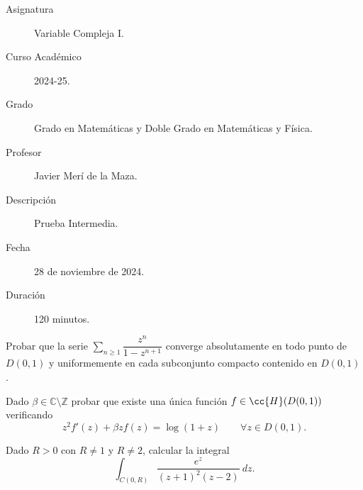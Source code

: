 \documentclass[12pt]{article}
\begin{document}

    
    

    \begin{description}
        \item[Asignatura] Variable Compleja I.
        \item[Curso Académico] 2024-25.
        \item[Grado] Grado en Matemáticas y Doble Grado en Matemáticas y Física.
        \item[Profesor] Javier Merí de la Maza.
        \item[Descripción] Prueba Intermedia.
        \item[Fecha] 28 de noviembre de 2024.
        \item[Duración] 120 minutos.
    
    \end{description}
    \newpage

    \begin{ejercicio}[2.5 puntos] Probar que la serie $\displaystyle \sum\limits_{n\geq 1} \dfrac{z^n}{1-z^{n+1}}$ converge absolutamente en todo punto de $D(0, 1)$ y uniformemente en cada subconjunto compacto contenido en $D(0, 1)$.
    \end{ejercicio}

    \begin{ejercicio}[2.5 puntos] Dado $\beta \in \mathbb{C} \setminus \mathbb{Z}$ probar que existe una única función $f \in \cc{H}(D(0, 1))$ verificando
        $$z^2 f'(z) + \beta z f(z) = \log(1 + z)\qquad \forall z \in D(0, 1).$$
    \end{ejercicio}

    \begin{ejercicio}[2 puntos] Dado $R > 0$ con $R \neq 1$ y $R \neq 2$, calcular la integral
        $$\int_{C(0,R)} \frac{e^z}{(z + 1)^2(z - 2)}\ dz.$$
    \end{ejercicio}
\end{document}
